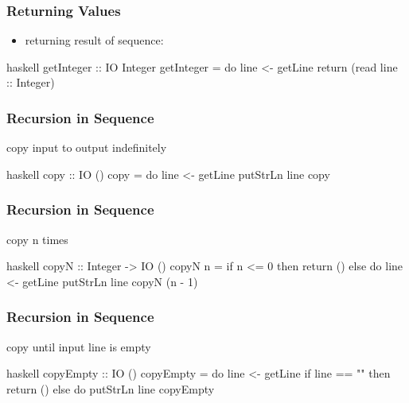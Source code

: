 \documentclass[dvipsnames]{beamer}
\theoremstyle{plain}
\begin{document}
\begin{frame}[fragile]
  \frametitle{Returning Values}

  \begin{itemize}
    \item returning result of sequence: 
  \end{itemize}

  \begin{exampleblock}{}
    \begin{pygments}{haskell}
getInteger :: IO Integer
getInteger = do
    line <- getLine
    return (read line :: Integer)
    \end{pygments}
  \end{exampleblock}
\end{frame}

\begin{frame}[fragile]
  \frametitle{Recursion in Sequence}

  \begin{exampleblock}{copy input to output indefinitely}
    \begin{pygments}{haskell}
copy :: IO ()
copy = do
    line <- getLine
    putStrLn line
    copy
    \end{pygments}
  \end{exampleblock}
\end{frame}

\begin{frame}[fragile]
  \frametitle{Recursion in Sequence}

  \begin{exampleblock}{copy n times}
    \begin{pygments}{haskell}
copyN :: Integer -> IO ()
copyN n =
    if n <= 0
        then return ()
        else do
            line <- getLine
            putStrLn line
            copyN (n - 1)
    \end{pygments}
  \end{exampleblock}
\end{frame}

\begin{frame}[fragile]
  \frametitle{Recursion in Sequence}

  \begin{exampleblock}{copy until input line is empty}
    \begin{pygments}{haskell}
copyEmpty :: IO ()
copyEmpty = do
    line <- getLine
    if line == ""
        then return ()
        else do
            putStrLn line
            copyEmpty
    \end{pygments}
  \end{exampleblock}
\end{frame}
\end{document}

